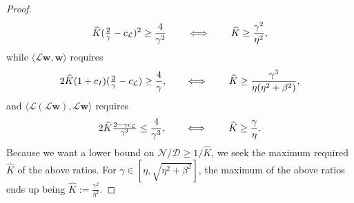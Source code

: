 \documentclass[a4paper,10pt]{article}
\begin{document}
\begin{proof}
\begin{align*}
\widehat{K}(\tfrac{2}{\gamma}-c_{\mathcal{L}})^2 \geq \frac{4}{\gamma^2}
	\hspace{5ex}\Longleftrightarrow\hspace{5ex}
\widehat{K} \geq \frac{\gamma^2}{\eta^2},
\end{align*}
%
while $\langle\mathcal{L}\mathbf{w},\mathbf{w}\rangle$ requires
%
\begin{align*}
2\widehat{K}(1+c_I)(\tfrac{2}{\gamma}-c_{\mathcal{L}})\geq \frac{4}{\gamma},
	\hspace{5ex}\Longleftrightarrow\hspace{5ex}
\widehat{K} \geq \frac{\gamma^3}{\eta(\eta^2+\beta^2)},
\end{align*}
%
and $\langle\mathcal{L}(\mathcal{L}\mathbf{w}),\mathcal{L}\mathbf{w}\rangle$
requires
%
\begin{align*}
2\widehat{K}\tfrac{2-\gamma c_{\mathcal{L}}}{\gamma^3} \leq \frac{4}{\gamma^3},
	\hspace{5ex}\Longleftrightarrow\hspace{5ex}
\widehat{K} \geq \frac{\gamma}{\eta}.
\end{align*}
%
Because we want a lower bound on $\mathcal{N}/\mathcal{D} \geq 1/\widehat{K}$,
we seek the maximum required $\widehat{K}$ of the above ratios. For
$\gamma \in[\eta,\sqrt{\eta^2+\beta^2}]$, the maximum of the
above ratios ends up being $\widehat{K} := \tfrac{\gamma^2}{\eta^2}$.


\end{proof}
\end{document}
